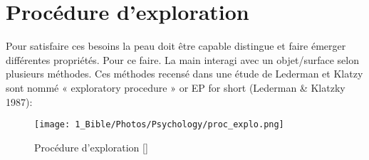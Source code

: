 \section{Procédure d’exploration}
Pour satisfaire ces besoins la peau doit être capable distingue et faire émerger différentes propriétés. Pour ce faire. La main interagi avec un objet/surface selon plusieurs méthodes. Ces méthodes recensé dans une étude de Lederman et Klatzy sont nommé « exploratory procedure » or EP for short (Lederman \& Klatzky 1987):\par
\begin{figure}[!h]
	\centering
	\texttt{[image: 1\_Bible/Photos/Psychology/proc\_explo.png]}
	\caption{Procédure d’exploration [] }\label{proc_explo}
\end{figure}


